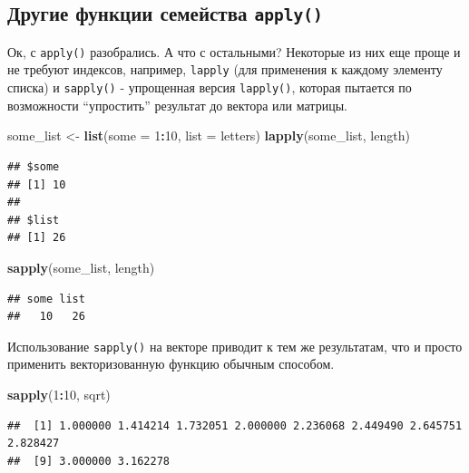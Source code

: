 \documentclass[]{book}
\newenvironment{Shaded}{\begin{snugshade}}{\end{snugshade}}
\newcommand{\KeywordTok}[1]{\textcolor[rgb]{0.13,0.29,0.53}{\textbf{#1}}}
\newcommand{\DataTypeTok}[1]{\textcolor[rgb]{0.13,0.29,0.53}{#1}}
\newcommand{\DecValTok}[1]{\textcolor[rgb]{0.00,0.00,0.81}{#1}}
\newcommand{\StringTok}[1]{\textcolor[rgb]{0.31,0.60,0.02}{#1}}
\newcommand{\OperatorTok}[1]{\textcolor[rgb]{0.81,0.36,0.00}{\textbf{#1}}}
\newcommand{\NormalTok}[1]{#1}
\begin{document}
\subsection{\texorpdfstring{Другие функции семейства
\texttt{apply()}}{Другие функции семейства apply()}}\label{apply_other}

Ок, с \texttt{apply()} разобрались. А что с остальными? Некоторые из них
еще проще и не требуют индексов, например, \texttt{lapply} (для
применения к каждому элементу списка) и \texttt{sapply()} - упрощенная
версия \texttt{lapply()}, которая пытается по возможности ``упростить''
результат до вектора или матрицы.

\begin{Shaded}
\begin{Highlighting}[]
\NormalTok{some_list <-}\StringTok{ }\KeywordTok{list}\NormalTok{(}\DataTypeTok{some =} \DecValTok{1}\OperatorTok{:}\DecValTok{10}\NormalTok{, }\DataTypeTok{list =}\NormalTok{ letters)}
\KeywordTok{lapply}\NormalTok{(some_list, length)}
\end{Highlighting}
\end{Shaded}

\begin{verbatim}
## $some
## [1] 10
## 
## $list
## [1] 26
\end{verbatim}

\begin{Shaded}
\begin{Highlighting}[]
\KeywordTok{sapply}\NormalTok{(some_list, length)}
\end{Highlighting}
\end{Shaded}

\begin{verbatim}
## some list 
##   10   26
\end{verbatim}

Использование \texttt{sapply()} на векторе приводит к тем же
результатам, что и просто применить векторизованную функцию обычным
способом.

\begin{Shaded}
\begin{Highlighting}[]
\KeywordTok{sapply}\NormalTok{(}\DecValTok{1}\OperatorTok{:}\DecValTok{10}\NormalTok{, sqrt)}
\end{Highlighting}
\end{Shaded}

\begin{verbatim}
##  [1] 1.000000 1.414214 1.732051 2.000000 2.236068 2.449490 2.645751 2.828427
##  [9] 3.000000 3.162278
\end{verbatim}
\end{document}
